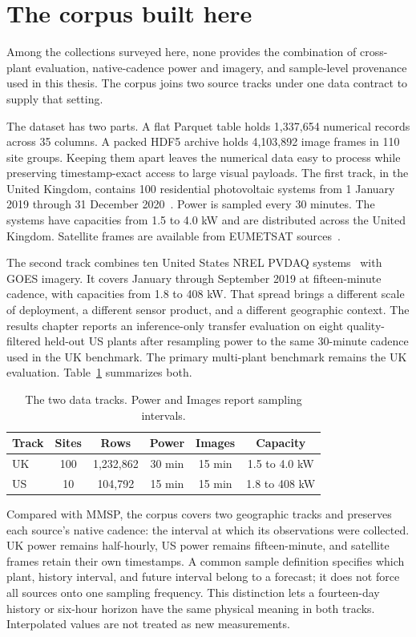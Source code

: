 \section{The corpus built here}

Among the collections surveyed here, none provides the combination of cross-plant evaluation, native-cadence power and imagery, and sample-level provenance used in this thesis. The corpus joins two source tracks under one data contract to supply that setting.

The dataset has two parts. A flat Parquet table holds 1,337,654 numerical records across 35 columns. A packed HDF5 archive holds 4,103,892 image frames in 110 site groups. Keeping them apart leaves the numerical data easy to process while preserving timestamp-exact access to large visual payloads. The first track, in the United Kingdom, contains 100 residential photovoltaic systems from 1 January 2019 through 31 December 2020~\cite{ukpv}. Power is sampled every 30 minutes. The systems have capacities from 1.5 to 4.0 kW and are distributed across the United Kingdom. Satellite frames are available from EUMETSAT sources~\cite{eumetsat}.

The second track combines ten United States NREL PVDAQ systems~\cite{pvdaq} with GOES imagery. It covers January through September 2019 at fifteen-minute cadence, with capacities from 1.8 to 408 kW. That spread brings a different scale of deployment, a different sensor product, and a different geographic context. The results chapter reports an inference-only transfer evaluation on eight quality-filtered held-out US plants after resampling power to the same 30-minute cadence used in the UK benchmark. The primary multi-plant benchmark remains the UK evaluation. Table~\ref{tab:data-tracks} summarizes both.

\begin{table}[htbp]
\centering
\begin{tabular}{@{}lccccc@{}}
\hline
Track & Sites & Rows & Power & Images & Capacity \\
\hline
UK & 100 & 1,232,862 & 30 min & 15 min & 1.5 to 4.0 kW \\
US & 10 & 104,792 & 15 min & 15 min & 1.8 to 408 kW \\
\hline
\end{tabular}
\caption{The two data tracks. Power and Images report sampling intervals.}
\label{tab:data-tracks}
\end{table}

Compared with MMSP, the corpus covers two geographic tracks and preserves each source's native cadence: the interval at which its observations were collected. UK power remains half-hourly, US power remains fifteen-minute, and satellite frames retain their own timestamps. A common sample definition specifies which plant, history interval, and future interval belong to a forecast; it does not force all sources onto one sampling frequency. This distinction lets a fourteen-day history or six-hour horizon have the same physical meaning in both tracks. Interpolated values are not treated as new measurements.

